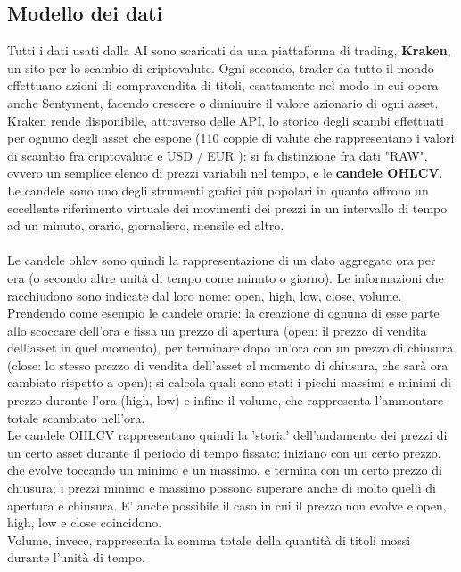 \documentclass{article}
\begin{document}
	\subsection{Modello dei dati}
		Tutti i dati usati dalla AI sono scaricati da una piattaforma di trading, \textbf{Kraken}, un sito per lo scambio di criptovalute. Ogni secondo, trader da tutto il mondo effettuano azioni di compravendita di titoli, esattamente nel modo in cui opera anche Sentyment, facendo crescere o diminuire il valore azionario di ogni asset. Kraken rende disponibile, attraverso delle API, lo storico degli scambi effettuati per ognuno degli asset che espone (110 coppie di valute che rappresentano i valori di scambio fra criptovalute e USD / EUR ): si fa distinzione fra dati "RAW", ovvero un semplice elenco di prezzi variabili nel tempo, e le \textbf{candele OHLCV}. Le candele sono uno degli strumenti grafici più popolari in quanto offrono un eccellente riferimento virtuale dei movimenti dei prezzi in un intervallo di tempo ad un minuto, orario, giornaliero, mensile ed altro.
		\\~\\		
		Le candele ohlcv sono quindi la rappresentazione di un dato aggregato ora per ora (o secondo altre unità di tempo come minuto o giorno). Le informazioni che racchiudono sono indicate dal loro nome: open, high, low, close, volume. Prendendo come esempio le candele orarie: la creazione di ognuna di esse parte allo scoccare dell'ora e fissa un prezzo di apertura (open: il prezzo di vendita dell'asset in quel momento), per terminare dopo un'ora con un prezzo di chiusura (close: lo stesso prezzo di vendita dell'asset al momento di chiusura, che sarà ora cambiato rispetto a open); si calcola quali sono stati i picchi massimi e minimi di prezzo durante l'ora (high, low) e infine il volume, che rappresenta l'ammontare totale scambiato nell'ora.\\ Le candele OHLCV rappresentano quindi la 'storia' dell'andamento dei prezzi di un certo asset durante il periodo di tempo fissato: iniziano con un certo prezzo, che evolve toccando un minimo e un massimo, e termina con un certo prezzo di chiusura; i prezzi minimo e massimo possono superare anche di molto quelli di apertura e chiusura. E' anche possibile il caso in cui il prezzo non evolve e open, high, low e close coincidono.\\ Volume, invece, rappresenta la somma totale della quantità di titoli mossi durante l'unità di tempo.
		\\~\\
		
\end{document}
